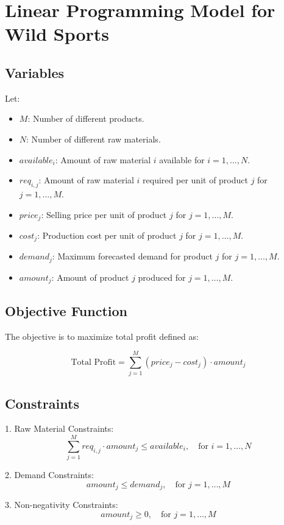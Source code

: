 \documentclass{article}
\begin{document}
\section*{Linear Programming Model for Wild Sports}

\subsection*{Variables}
Let:
\begin{itemize}
    \item \( M \): Number of different products.
    \item \( N \): Number of different raw materials.
    \item \( available_i \): Amount of raw material \( i \) available for \( i = 1, \ldots, N \).
    \item \( req_{i,j} \): Amount of raw material \( i \) required per unit of product \( j \) for \( j = 1, \ldots, M \).
    \item \( price_j \): Selling price per unit of product \( j \) for \( j = 1, \ldots, M \).
    \item \( cost_j \): Production cost per unit of product \( j \) for \( j = 1, \ldots, M \).
    \item \( demand_j \): Maximum forecasted demand for product \( j \) for \( j = 1, \ldots, M \).
    \item \( amount_j \): Amount of product \( j \) produced for \( j = 1, \ldots, M \).
\end{itemize}

\subsection*{Objective Function}
The objective is to maximize total profit defined as:

\[
\text{Total Profit} = \sum_{j=1}^{M} (price_j - cost_j) \cdot amount_j
\]

\subsection*{Constraints}
1. Raw Material Constraints:
   \[
   \sum_{j=1}^{M} req_{i,j} \cdot amount_j \leq available_i, \quad \text{for } i = 1, \ldots, N
   \]

2. Demand Constraints:
   \[
   amount_j \leq demand_j, \quad \text{for } j = 1, \ldots, M
   \]

3. Non-negativity Constraints:
   \[
   amount_j \geq 0, \quad \text{for } j = 1, \ldots, M
   \]
\end{document}
